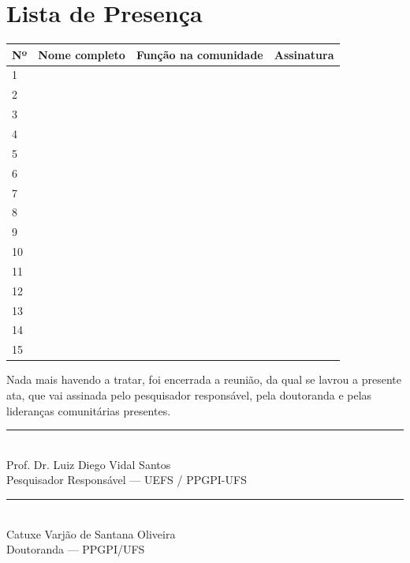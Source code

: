 \documentclass[12pt,a4paper,brazil]{article}
\begin{document}
\section*{Lista de Presença}

\begin{longtable}{|p{0.5cm}|p{5.5cm}|p{3cm}|p{4cm}|}
\hline
\textbf{Nº} & \textbf{Nome completo} & \textbf{Função na comunidade} & \textbf{Assinatura} \\
\hline
1 & & & \\[0.8cm]
\hline
2 & & & \\[0.8cm]
\hline
3 & & & \\[0.8cm]
\hline
4 & & & \\[0.8cm]
\hline
5 & & & \\[0.8cm]
\hline
6 & & & \\[0.8cm]
\hline
7 & & & \\[0.8cm]
\hline
8 & & & \\[0.8cm]
\hline
9 & & & \\[0.8cm]
\hline
10 & & & \\[0.8cm]
\hline
11 & & & \\[0.8cm]
\hline
12 & & & \\[0.8cm]
\hline
13 & & & \\[0.8cm]
\hline
14 & & & \\[0.8cm]
\hline
15 & & & \\[0.8cm]
\hline
\end{longtable}

\vspace{0.5cm}

\noindent Nada mais havendo a tratar, foi encerrada a reunião, da qual se lavrou a presente ata, que vai assinada pelo pesquisador responsável, pela doutoranda e pelas lideranças comunitárias presentes.

\vspace{2cm}

\noindent
\begin{minipage}[t]{0.48\textwidth}
\centering
\rule{7cm}{0.4pt}\\
Prof. Dr. Luiz Diego Vidal Santos\\
Pesquisador Responsável --- UEFS / PPGPI-UFS
\end{minipage}
\hfill
\begin{minipage}[t]{0.48\textwidth}
\centering
\rule{7cm}{0.4pt}\\
Catuxe Varjão de Santana Oliveira\\
Doutoranda --- PPGPI/UFS
\end{minipage}
\end{document}
